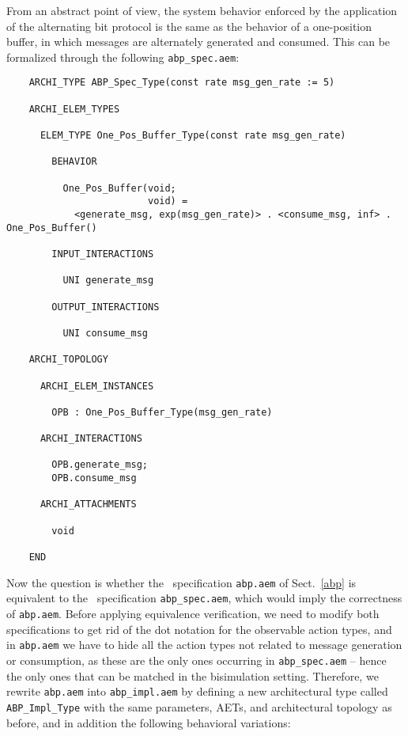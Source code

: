 From an abstract point of view, the system behavior enforced by the application of the alternating bit
protocol is the same as the behavior of a one-position buffer, in which messages are alternately generated
and consumed. This can be formalized through the following {\tt abp\_spec.aem}:

	\begin{verbatim}
    ARCHI_TYPE ABP_Spec_Type(const rate msg_gen_rate := 5)

    ARCHI_ELEM_TYPES

      ELEM_TYPE One_Pos_Buffer_Type(const rate msg_gen_rate)

        BEHAVIOR

          One_Pos_Buffer(void;
                         void) =
            <generate_msg, exp(msg_gen_rate)> . <consume_msg, inf> . One_Pos_Buffer()

        INPUT_INTERACTIONS

          UNI generate_msg

        OUTPUT_INTERACTIONS

          UNI consume_msg

    ARCHI_TOPOLOGY

      ARCHI_ELEM_INSTANCES

        OPB : One_Pos_Buffer_Type(msg_gen_rate)

      ARCHI_INTERACTIONS

        OPB.generate_msg;
        OPB.consume_msg

      ARCHI_ATTACHMENTS

        void

    END
	\end{verbatim}

Now the question is whether the \aemilia\ specification {\tt abp.aem} of Sect.~\ref{abp} is equivalent to
the \aemilia\ specification {\tt abp\_spec.aem}, which would imply the correctness of {\tt abp.aem}. Before
applying equivalence verification, we need to modify both specifications to get rid of the dot notation for
the observable action types, and in {\tt abp.aem} we have to hide all the action types not related to
message generation or consumption, as these are the only ones occurring in {\tt abp\_spec.aem} -- hence the
only ones that can be matched in the bisimulation setting. Therefore, we rewrite {\tt abp.aem} into
{\tt abp\_impl.aem} by defining a new architectural type called {\tt ABP\_Impl\_Type} with the same
parameters, AETs, and architectural topology as before, and in addition the following behavioral variations:

